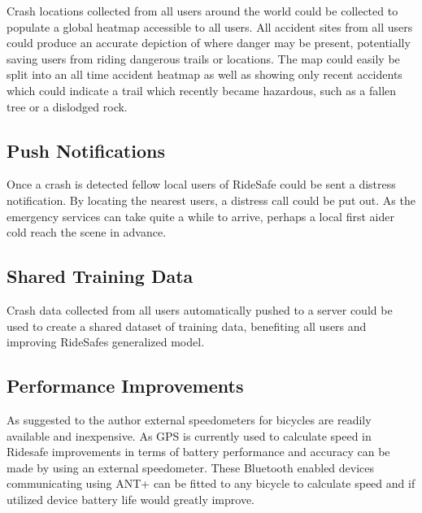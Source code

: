 Crash locations collected from all users around the world could be collected to populate a global heatmap accessible to all users. All accident sites from all users could produce an accurate depiction of where danger may be present, potentially saving users from riding dangerous trails or locations. The map could easily be split into an all time accident heatmap as well as showing only recent accidents which could indicate a trail which recently became hazardous, such as a fallen tree or a dislodged rock.



\subsection *{Push Notifications}
Once a crash is detected fellow local users of RideSafe could be sent a distress notification. By locating the nearest users, a distress call could be put out. As the emergency services can take quite a while to arrive, perhaps a local first aider cold reach the scene in advance.




\subsection *{Shared Training Data}
Crash data collected from all users automatically pushed to a server could be used to create a shared dataset of training data, benefiting all users and improving RideSafes generalized model.



\subsection {Performance Improvements}


As suggested to the author external speedometers for bicycles are readily available and inexpensive. As GPS is currently used to calculate speed in Ridesafe improvements in terms of battery performance and accuracy can be made by using an external speedometer. These Bluetooth enabled devices communicating using ANT+ can be fitted to any bicycle to calculate speed and if utilized device battery life would greatly improve. 
